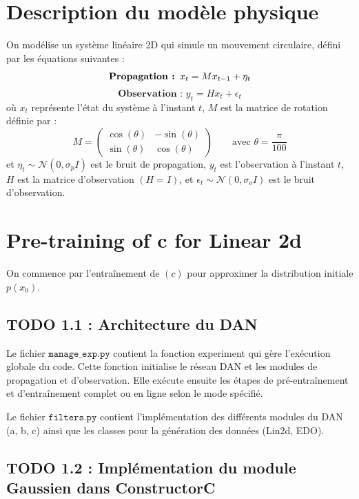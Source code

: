 \documentclass[12pt,a4paper]{article}
\begin{document}
\section{Description du modèle physique}
On modélise un système linéaire 2D qui simule un mouvement circulaire, défini par les équations suivantes :
\begin{equation}
    \textbf{Propagation : } x_t = Mx_{t-1} + \eta_t \\
\end{equation}
\begin{equation}
    \textbf{Observation : } y_t = Hx_t + \epsilon_t
\end{equation}
où $x_t$ représente l'état du système à l'instant $t$, $M$ est la matrice de rotation définie par :
$$
M = \begin{pmatrix}
    \cos(\theta) & -\sin(\theta) \\
    \sin(\theta) & \cos(\theta)
\end{pmatrix} \qquad \text{avec } \theta = \frac{\pi}{100}
$$
et $\eta_t \sim \mathcal{N}(0, \sigma_pI)$ est le bruit de propagation, $y_t$ est l'observation à l'instant $t$, $H$ est la matrice d'observation $(H = I)$, et $\epsilon_t \sim \mathcal{N}(0, \sigma_oI)$ est le bruit d'observation. \\

\section{Pre-training of c for Linear 2d}
On commence par l'entraînement de $(c)$ pour approximer la distribution initiale $p(x_0)$.


\subsection*{TODO 1.1 : Architecture du DAN}

Le fichier $\texttt{manage\_exp.py}$ contient la fonction experiment qui gère l'exécution globale du code.
Cette fonction initialise le réseau DAN et les modules de propagation et d'observation.
Elle exécute ensuite les étapes de pré-entraînement et d'entraînement complet ou en ligne selon le mode spécifié.

Le fichier $\texttt{filters.py}$ contient l'implémentation des différents modules du DAN (a, b, c) ainsi que les classes pour la génération des données (Lin2d, EDO). \\

\subsection*{TODO 1.2 : Implémentation du module Gaussien dans ConstructorC}
\end{document}
